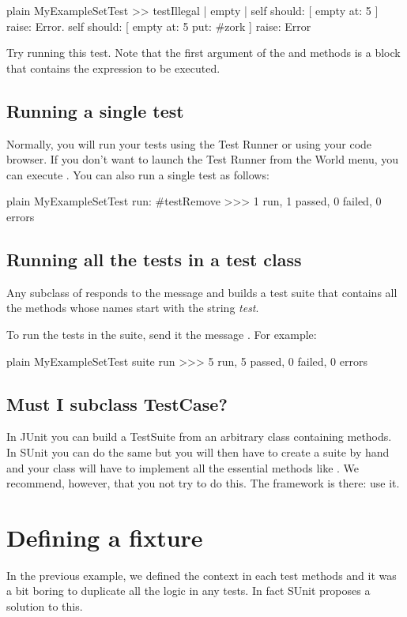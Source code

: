 \documentclass[10pt,twoside,english]{_support/latex/sbabook/sbabook}
\begin{document}
\begin{displaycode}{plain}
MyExampleSetTest >> testIllegal
	| empty |
	self should: [ empty at: 5 ] raise: Error.
	self should: [ empty at: 5 put: #zork ] raise: Error
\end{displaycode}

Try running this test. Note that the first argument of the  and
 methods is a block that contains the expression to be executed.
\subsection{Running a single test}
Normally, you will run your tests using the Test Runner or using your code
browser. If you don't want to launch the Test Runner from the World menu, you
can execute . You can also run a single test as follows:

\begin{displaycode}{plain}
MyExampleSetTest run: #testRemove
>>> 1 run, 1 passed, 0 failed, 0 errors
\end{displaycode}
\subsection{Running all the tests in a test class}
Any subclass of  responds to the message  and builds
a test suite that contains all the methods whose names start with
the string \textit{test}.

To run the tests in the suite, send it the message . For example:

\begin{displaycode}{plain}
MyExampleSetTest suite run 
>>> 5 run, 5 passed, 0 failed, 0 errors
\end{displaycode}
\subsection{Must I subclass TestCase?}
In JUnit you can build a TestSuite from an arbitrary class containing 
methods. In SUnit you can do the same but you will then have to create a suite
by hand and your class will have to implement all the essential 
methods like . We recommend, however, that you not try to do this.
The framework is there: use it.
\section{Defining a fixture}
In the previous example, we defined the context in each test methods and it was a bit boring to 
duplicate all the logic in any tests. In fact SUnit proposes a solution to this.
\end{document}
